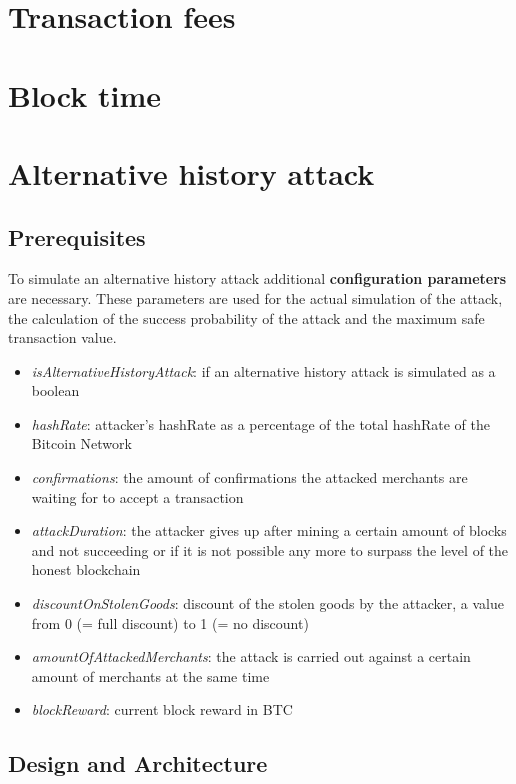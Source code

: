 \section{Transaction fees}

\section{Block time}

\section{Alternative history attack}

\subsection{Prerequisites}

To simulate an alternative history attack additional \textbf{configuration parameters} are necessary. These parameters are used for the actual simulation of the attack, the calculation of the success probability of the attack and the maximum safe transaction value.

\begin{itemize}
\item \textit{isAlternativeHistoryAttack}: if an alternative history attack is simulated as a boolean
\item \textit{hashRate}: attacker's hashRate as a percentage of the total hashRate of the Bitcoin Network
\item \textit{confirmations}: the amount of confirmations the attacked merchants are waiting for to accept a transaction
\item \textit{attackDuration}: the attacker gives up after mining a certain amount of blocks and not succeeding or if it is not possible any more to surpass the level of the honest blockchain
\item \textit{discountOnStolenGoods}: discount of the stolen goods by the attacker, a value from 0 (= full discount) to 1 (= no discount)
\item \textit{amountOfAttackedMerchants}: the attack is carried out against a certain amount of merchants at the same time
\item \textit{blockReward}: current block reward in BTC
\end{itemize}

\subsection{Design and Architecture}

